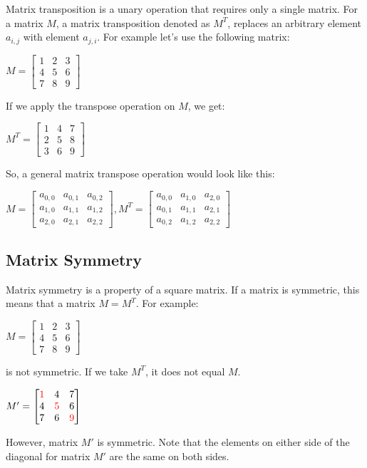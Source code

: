 \documentclass[12pt]{article}
\begin{document}
Matrix transposition is a unary operation that requires only a single matrix. For a matrix $M$, a matrix transposition denoted as $M^T$, replaces an arbitrary element $a_{i, j}$ with element $a_{j, i}$. For example let's use the following matrix:
\begin{center}
$M = \begin{bmatrix} 1 & 2 & 3 \\ 4 & 5 & 6 \\ 7 & 8 & 9 \end{bmatrix}$
\end{center}
If we apply the transpose operation on $M$, we get:
\begin{center}
$M^T = \begin{bmatrix} 1 & 4 & 7 \\ 2 & 5 & 8 \\ 3 & 6 & 9 \end{bmatrix}$
\end{center}
So, a general matrix transpose operation would look like this:
\begin{center}
$M = 
 \begin{bmatrix} a_{0, 0} & a_{0, 1} & a_{0, 2} \\
 		         a_{1, 0} & a_{1, 1} & a_{1, 2} \\
		         a_{2, 0} & a_{2, 1} & a_{2, 2}
 \end{bmatrix},
 M^T = 
  \begin{bmatrix} a_{0, 0} & a_{1, 0} & a_{2, 0} \\
 		          a_{0, 1} & a_{1, 1} & a_{2, 1} \\
		          a_{0, 2} & a_{1, 2} & a_{2, 2}
 \end{bmatrix}
$
\end{center}

\subsection{Matrix Symmetry}
Matrix symmetry is a property of a square matrix. If a matrix is symmetric, this means that a matrix $M = M^T$.
For example:
\begin{center}
$M = \begin{bmatrix} 1 & 2 & 3 \\ 4 & 5 & 6 \\ 7 & 8 & 9 \end{bmatrix}$
\end{center}
is not symmetric. If we take $M^T$, it does not equal $M$.
\begin{center}
$M' = \begin{bmatrix} \color{red} 1 & 4 & 7 \\ 4 & \color{red}5 & 6 \\ 7 & 6 & \color{red}9 \end{bmatrix}$
\end{center}
However, matrix $M'$ is symmetric. Note that the elements on either side of the diagonal for matrix $M'$ are the same on both sides.
\end{document}
